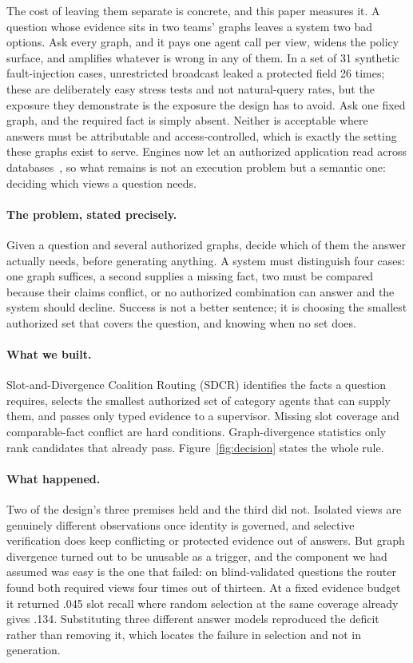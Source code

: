 \documentclass{article}
\begin{document}
The cost of leaving them separate is concrete, and this paper measures it. A
question whose evidence sits in two teams' graphs leaves a system two bad
options. Ask every graph, and it pays one agent call per view, widens the
policy surface, and amplifies whatever is wrong in any of them. In a set of 31
synthetic fault-injection cases, unrestricted broadcast leaked a protected field
26 times; these are deliberately easy stress tests and not natural-query rates,
but the exposure they demonstrate is the exposure the design has to avoid. Ask one fixed graph, and the required fact is simply absent. Neither is
acceptable where answers must be attributable and access-controlled, which is
exactly the setting these graphs exist to serve. Engines now let an authorized
application read across databases~\citep{memgraph2026}, so what remains is not
an execution problem but a semantic one: deciding which views a question needs.

\paragraph{The problem, stated precisely.} Given a question and several
authorized graphs, decide which of them the answer actually needs, before
generating anything. A system must distinguish four cases: one graph suffices,
a second supplies a missing fact, two must be compared because their claims
conflict, or no authorized combination can answer and the system should decline.
Success is not a better sentence; it is choosing the smallest authorized set
that covers the question, and knowing when no set does.

\paragraph{What we built.} Slot-and-Divergence Coalition Routing (SDCR)
identifies the facts a question requires, selects the smallest authorized set of
category agents that can supply them, and passes only typed evidence to a
supervisor. Missing slot coverage and comparable-fact conflict are hard
conditions. Graph-divergence statistics only rank candidates that already pass.
Figure~\ref{fig:decision} states the whole rule.

\paragraph{What happened.} Two of the design's three premises held and the third
did not. Isolated views are genuinely different observations once identity is
governed, and selective verification does keep conflicting or protected evidence
out of answers. But graph divergence turned out to be unusable as a trigger, and
the component we had assumed was easy is the one that failed: on blind-validated
questions the router found both required views four times out of thirteen. At a
fixed evidence budget it returned .045 slot recall where random selection at the
same coverage already gives .134. Substituting three different answer models
reproduced the deficit rather than removing it, which locates the failure in
selection and not in generation.
\end{document}
